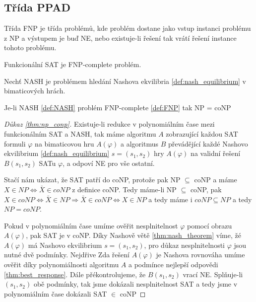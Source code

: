 \subsection{Třída PPAD}
\begin{definition}
\label{def:FNP}
Třída FNP je třída problémů, kde problém dostane jako vstup instanci problému z NP a výstupem je buď NE, nebo existuje-li řešení tak vrátí řešení instance tohoto problému. 

Funkcionální SAT je FNP-complete problém. 
\end{definition}
\begin{definition}\label{def:NASH}
Nechť NASH je problémem hledání Nashova ekvilibria \ref{def:nash_equilibrium} v bimaticových hrách. 
\end{definition}

\begin{theorem}
\label{thm:np_conp}
Je-li NASH \ref{def:NASH} problém FNP-complete \ref{def:FNP} tak NP = coNP
\end{theorem}
\begin{proof}[Důkaz \ref{thm:np_conp}]
    Existuje-li redukce v polynomiálním čase mezi funkcionálním SAT a NASH, tak máme algoritmu $A$ zobrazující každou SAT formuli $\varphi$ na bimaticovou hru $A(\varphi)$ a algoritmus $B$ převádějící každé Nashovo ekvilibrium \ref{def:nash_equilibrium} $s = (s_1, s_2)$ hry $A(\varphi)$ na validní řešení $B(s_1,s_2)$ SATu $\varphi$, a odpoví NE pro vše ostatní.


    Stačí nám ukázat, že SAT patří do coNP, protože pak NP $\subseteq$ coNP a máme $X \in NP \iff \bar{X} \in coNP$ z definice coNP. 
    Tedy máme-li NP $\subseteq$ coNP, pak $X \in coNP \iff \bar{X} \in NP \Rightarrow \bar{X} \in coNP \iff X \in NP$ a tedy máme i $coNP \subseteq NP$ a tedy $NP = coNP$. 

    Pokud v polynomiálním čase umíme ověřit nesplnitelnost $\varphi$ pomocí obrazu $A(\varphi)$, pak SAT je v coNP. 
    Díky Nashově větě \ref{thm:nash_theorem} víme, žé $A(\varphi)$ má Nashovo ekvilibrium $s = (s_1, s_2)$, pro důkaz nesplnitelnosti $\varphi$ jsou nutné dvě podmínky.
    Nejdřive Zda řešení $A(\varphi)$ je Nashova rovnováha umíme ověřit díky polynomiálnosti algoritmu $A$ a podmínce nejlepší odpovědi \ref{thm:best_response}.
    Dále přékontrolujeme, že $B(s_1, s_2)$ vrací NE. 
    Splňuje-li $(s_1,s_2)$ obě podmínky, tak jsme dokázali nesplnitelnost SAT a tedy jsme v polynomiálním čase dokázali SAT $\in$ coNP
\end{proof}

